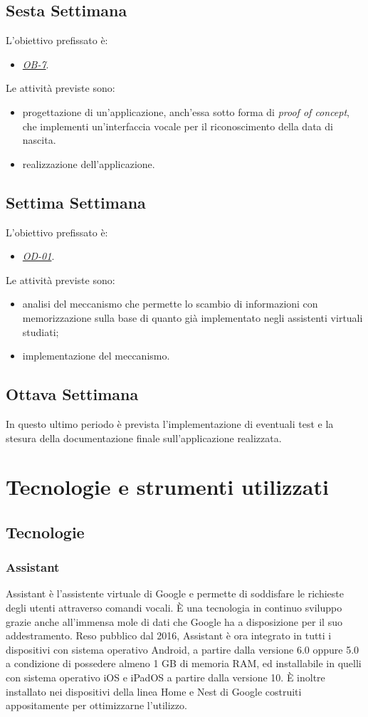 	\subsection*{Sesta Settimana}
	L'obiettivo prefissato è:
	\begin{itemize}
		\item \textit{\underline{OB-7}}.
	\end{itemize}
	Le attività previste sono:
	\begin{itemize}
		\item progettazione di un'applicazione, anch'essa sotto forma di \textit{proof of concept}, che implementi un'interfaccia vocale per il riconoscimento della data di nascita.
		\item realizzazione dell'applicazione.
	\end{itemize}
	\subsection*{Settima Settimana}
	L'obiettivo prefissato è:
	\begin{itemize}
		\item \textit{\underline{OD-01}}.
	\end{itemize}
	Le attività previste sono:
	\begin{itemize}
		\item analisi del meccanismo che permette lo scambio di informazioni con memorizzazione sulla base di quanto già implementato negli assistenti virtuali studiati;
		\item implementazione del meccanismo.
	\end{itemize}
	\subsection*{Ottava Settimana}
	In questo ultimo periodo è prevista l'implementazione di eventuali test e la stesura della documentazione finale sull'applicazione realizzata.

\section{Tecnologie e strumenti utilizzati}
	\subsection{Tecnologie}
		\subsubsection{Assistant}
		Assistant è l'assistente virtuale di Google e permette di soddisfare le richieste degli utenti attraverso comandi vocali. È una tecnologia in continuo sviluppo grazie anche all'immensa mole di dati che Google ha a disposizione per il suo addestramento. Reso pubblico dal 2016, Assistant è ora integrato in tutti i dispositivi con sistema operativo Android, a partire dalla versione 6.0 oppure 5.0 a condizione di possedere almeno 1 GB di memoria RAM, ed installabile in quelli con sistema operativo iOS e iPadOS a partire dalla versione 10. È inoltre installato nei dispositivi della linea Home e Nest di Google costruiti appositamente per ottimizzarne l'utilizzo.
